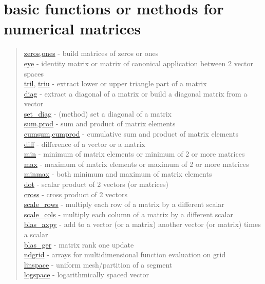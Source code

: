 \chapter*{basic functions or methods for numerical matrices}
\hypertarget{basicnumarrays}{}
\begin{quote}
\noindent
\hyperlink{zeros}{zeros},\hyperlink{ones}{ones} - build matrices of zeros or ones \\
\hyperlink{eye}{eye} - identity matrix or matrix of canonical application between 2 vector spaces \\
\hyperlink{tril}{tril}, \hyperlink{triu}{triu} - extract lower or upper triangle part of a matrix \\
\hyperlink{diag}{diag} - extract a diagonal of a matrix or build a diagonal matrix from a vector \\
\hyperlink{set_diag}{set\_diag} - (method) set a diagonal of a matrix \\
\hyperlink{sum}{sum},\hyperlink{prod}{prod} - sum and product of matrix elements \\
\hyperlink{cumsum}{cumsum},\hyperlink{cumprod}{cumprod} - cumulative sum and product of matrix elements \\
\hyperlink{diff}{diff} - difference of a vector or a matrix \\
\hyperlink{min}{min} - minimum of matrix elements or minimum of 2 or more matrices \\
\hyperlink{max}{max} - maximum of matrix elements or maximum of 2 or more matrices \\
\hyperlink{minmax}{minmax} - both minimum and maximum of matrix elements\\
\hyperlink{dot}{dot} - scalar product of 2 vectors (or matrices) \\
\hyperlink{cross}{cross} - cross product of 2 vectors \\
\hyperlink{scale_rows}{scale\_rows} - multiply each row of a matrix by a different scalar \\
\hyperlink{scale_cols}{scale\_cols} - multiply each column of a matrix by a different scalar \\
\hyperlink{blas_axpy}{blas\_axpy} -  add to a vector (or a matrix) another vector (or matrix) times a scalar\\ 
\hyperlink{blas_ger}{blas\_ger} -  matrix rank one update\\ 
\hyperlink{ndgrid}{ndgrid} - arrays for multidimensional function evaluation on grid \\
\hyperlink{linspace}{linspace} - uniform mesh/partition of a segment \\
\hyperlink{logspace}{logspace} - logarithmically spaced vector \\
\end{quote}
 
